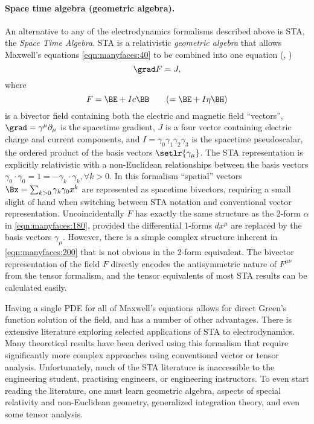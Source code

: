 \paragraph{Space time algebra (geometric algebra).}
An alternative to any of the electrodynamics formalisms described above is
STA, the \textit{Space Time Algebra}.
STA is a relativistic \textit{geometric algebra} that allows Maxwell's equations \cref{eqn:manyfaces:40} to be combined into one equation (\citep{doran2003gap}, \citep{hestenes1966space})
\begin{dmath}\label{eqn:manyfaces:80}
\grad F = J,
\end{dmath}
where
\begin{equation}\label{eqn:manyfaces:200}
F = \BE + I c \BB \qquad (= \BE + I \eta \BH)
\end{equation}
is a bivector
field containing both the electric and magnetic field ``vectors'', \( \grad = \gamma^\mu \partial_\mu \) is the spacetime gradient, \( J \) is a four vector containing electric charge and current components, and \( I = \gamma_0 \gamma_1 \gamma_2 \gamma_3 \) is the spacetime pseudoscalar, the ordered product of the basis vectors \( \setlr{ \gamma_\mu } \).
The STA representation is explicitly relativistic with a non-Euclidean relationships between the basis vectors \( \gamma_0 \cdot \gamma_0 = 1 = -\gamma_k \cdot \gamma_k, \forall k > 0 \).
In this formalism ``spatial'' vectors \( \Bx = \sum_{k>0} \gamma_k \gamma_0 x^k \) are represented as spacetime bivectors, requiring a small slight of hand when switching between STA notation and conventional vector representation.
Uncoincidentally \( F \) has exactly the same structure as the 2-form \(\alpha\) in \cref{eqn:manyfaces:180}, provided the differential 1-forms \( dx^\mu \) are replaced by the basis vectors \( \gamma_\mu \).
However, there is a simple complex structure inherent in \cref{eqn:manyfaces:200} that is not obvious in the 2-form equivalent.
The bivector representation of the field \( F \) directly encodes the antisymmetric nature of \( F^{\mu\nu} \) from the tensor formalism, and the tensor equivalents of most STA results can be calculated easily.

Having a single PDE for all of Maxwell's equations allows for direct Green's function solution of the field, and has a number of other advantages.
There is extensive literature exploring selected applications of STA to electrodynamics.
Many theoretical results have been derived using this formalism that require significantly more complex approaches using conventional vector or tensor analysis.
Unfortunately, much of the STA literature is inaccessible to the engineering student, practising engineers, or engineering instructors.
To even start reading the literature, one must learn geometric algebra, aspects of special relativity and non-Euclidean geometry, generalized integration theory, and even some tensor analysis.

